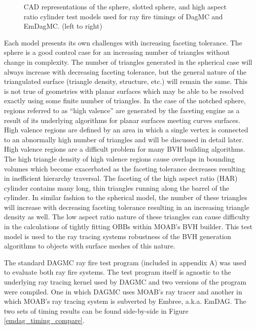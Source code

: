 \documentclass[12pt, a4paper]{article}
\begin{document}
\begin{figure}
\begin{center}
    \caption{CAD representations of the sphere, slotted sphere, and high aspect ratio cylinder test models used for ray fire timings of DagMC and EmDagMC. (left to right) \label{models}}

  \end{center}
\vspace{-0.3cm}

\end{figure} 


Each model presents its own challenges with increasing faceting tolerance. The sphere is a good control case for an increasing number of triangles without change in complexity. The number of triangles generated in the spherical case will always increase with decreasing faceting tolerance, but the general nature of the triangulated surface (triangle density, structure, etc.) will remain the same. This is not true of geometries with planar surfaces which may be able to be resolved exactly using some finite number of triangles. In the case of the notched sphere, regions referred to as ``high valence'' are generated by the faceting engine as a result of its underlying algorithms for planar surfaces meeting curves surfaces. High valence regions are defined by an area in which a single vertex is connected to an abnormally high number of triangles and will be discussed in detail later. High valence regions are a difficult problem for many BVH building algorithms. The high triangle density of high valence regions cause overlaps in bounding volumes which become exacerbated as the faceting tolerance decreases resulting in inefficient hierarchy traversal. The faceting of the high aspect ratio (HAR) cylinder contains many long, thin triangles running along the barrel of the cylinder. In similar fashion to the spherical model, the number of these triangles will increase with decreasing faceting tolerance resulting in an increasing triangle density as well. The low aspect ratio nature of these triangles can cause difficulty in the calculations of tightly fitting OBBs within MOAB's BVH builder. This test model is used to the ray tracing systems robustness of the BVH generation algorithms to objects with surface meshes of this nature.

The standard DAGMC ray fire test program (included in appendix A) was used to evaluate both ray fire systems. The test program itself is agnostic to the underlying ray tracing kernel used by DAGMC and two versions of the program were compiled. One in which DAGMC uses MOAB's ray tracer and another in which MOAB's ray tracing system is subverted by Embree, a.k.a. EmDAG. The two sets of timing results can be found side-by-side in Figure \ref{emdag_timing_compare}.
\end{document}

